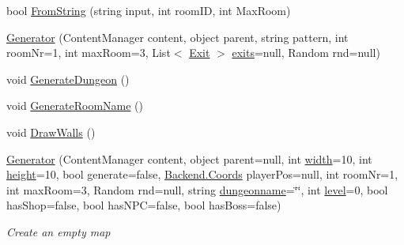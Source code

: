 \begin{DoxyCompactItemize}
bool \hyperlink{class_gruppe22_1_1_backend_1_1_generator_a58536bf78efafe5a8dd9371ec21ede7d}{From\-String} (string input, int room\-I\-D, int Max\-Room)
\item 
\hyperlink{class_gruppe22_1_1_backend_1_1_generator_a8e8cfc06fe85ddb9bbd411d302c0ea9b}{Generator} (Content\-Manager content, object parent, string pattern, int room\-Nr=1, int max\-Room=3, List$<$ \hyperlink{class_gruppe22_1_1_backend_1_1_exit}{Exit} $>$ \hyperlink{class_gruppe22_1_1_backend_1_1_generator_a08c85796fec36eaf888e0c2d8af5cb64}{exits}=null, Random rnd=null)
\item 
void \hyperlink{class_gruppe22_1_1_backend_1_1_generator_a88a3cb0906939d17f3da6ec4de64d806}{Generate\-Dungeon} ()
\item 
void \hyperlink{class_gruppe22_1_1_backend_1_1_generator_a7bf9e6e47ab06d7170532fcf8973a4ce}{Generate\-Room\-Name} ()
\item 
void \hyperlink{class_gruppe22_1_1_backend_1_1_generator_abaad74e28f0f25b9abab6e9c22960bff}{Draw\-Walls} ()
\item 
\hyperlink{class_gruppe22_1_1_backend_1_1_generator_a83efc83dbd633e8f008a05df0dc45812}{Generator} (Content\-Manager content, object parent=null, int \hyperlink{class_gruppe22_1_1_backend_1_1_map_ae185d7c51dd35311f6065044e603e81f}{width}=10, int \hyperlink{class_gruppe22_1_1_backend_1_1_map_aef59f2269d64d10b35acbabb6461fa55}{height}=10, bool generate=false, \hyperlink{class_gruppe22_1_1_backend_1_1_coords}{Backend.\-Coords} player\-Pos=null, int room\-Nr=1, int max\-Room=3, Random rnd=null, string \hyperlink{class_gruppe22_1_1_backend_1_1_map_a76814bb49c2210b400230b9ee530010f}{dungeonname}=\char`\"{}\char`\"{}, int \hyperlink{class_gruppe22_1_1_backend_1_1_map_abf7263c43d22ca634eceba89c06904cf}{level}=0, bool has\-Shop=false, bool has\-N\-P\-C=false, bool has\-Boss=false)
\begin{DoxyCompactList}\small\item\em Create an empty map \end{DoxyCompactList}\end{DoxyCompactItemize}
